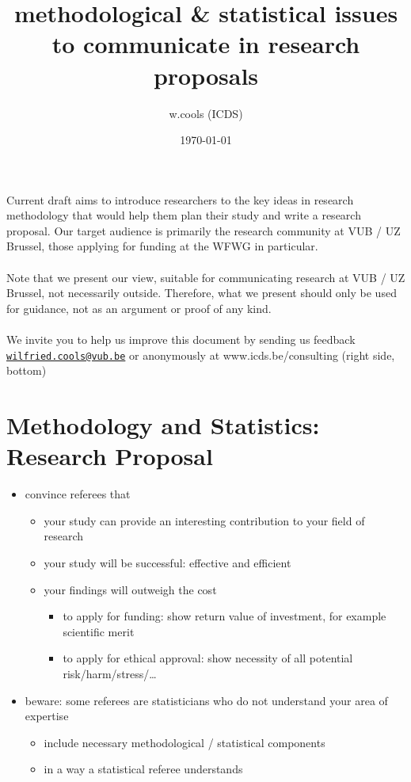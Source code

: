 \documentclass[]{article}
\title{methodological \& statistical issues\\
to communicate in research proposals}
\author{w.cools (ICDS)}
\date{\today}
\providecommand{\tightlist}{%
  \setlength{\itemsep}{0pt}\setlength{\parskip}{0pt}}
\begin{document}
\maketitle

Current draft aims to introduce researchers to the key ideas in research
methodology that would help them plan their study and write a research
proposal. Our target audience is primarily the research community at VUB
/ UZ Brussel, those applying for funding at the WFWG in particular.\\
\\
Note that we present our view, suitable for communicating research at
VUB / UZ Brussel, not necessarily outside. Therefore, what we present
should only be used for guidance, not as an argument or proof of any
kind.\\
\\
We invite you to help us improve this document by sending us feedback
\href{mailto:wilfried.cools@vub.be}{\nolinkurl{wilfried.cools@vub.be}}
or anonymously at www.icds.be/consulting (right side, bottom)

\newpage

\section{Methodology and Statistics: Research
Proposal}\label{methodology-and-statistics-research-proposal}

\begin{itemize}
\tightlist
\item
  convince referees that

  \begin{itemize}
  \tightlist
  \item
    your study can provide an interesting contribution to your field of
    research
  \item
    your study will be successful: effective and efficient
  \item
    your findings will outweigh the cost

    \begin{itemize}
    \tightlist
    \item
      to apply for funding: show return value of investment, for example
      scientific merit
    \item
      to apply for ethical approval: show necessity of all potential
      risk/harm/stress/\ldots{} \\
    \end{itemize}
  \end{itemize}
\item
  beware: some referees are statisticians who do not understand your
  area of expertise

  \begin{itemize}
  \tightlist
  \item
    include necessary methodological / statistical components
  \item
    in a way a statistical referee understands
  \end{itemize}
\end{itemize}
\end{document}

